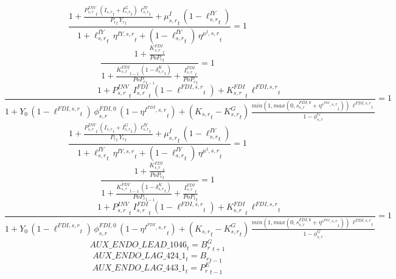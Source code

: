 \noindent[name= `Investment-to-GDP wedge 4 1']
\begin{dmath}
\frac{1+\frac{{{P^{INV}_{s,r}}}_{t}\, \left({{I_{s,r}}}_{t}+{{I^G_{s,r}}}_{t}\right)\, {{\ell^{IY}_{s,r}}}_{t}}{{{P_{r}}}_{t}\, {{Y_r}}_{t}}+{{\mu^{I}_{s,r}}}_{t}\, \left(1-{{\ell^{IY}_{s,r}}}_{t}\right)}{1+{{\ell^{IY}_{s,r}}}_{t}\, {{\eta^{IY,s,r}}}_{t}+\left(1-{{\ell^{IY}_{s,r}}}_{t}\right)\, {{\eta^{\mu^{I},s,r}}}_{t}}=1
\end{dmath}
\noindent[name= `K\_FDI LOM 4 1']
\begin{dmath}
\frac{1+\frac{{{K^{FDI}_{s,r}}}_{t}}{{{PoP_r}}_{t}}}{1+\frac{{{K^{FDI}_{s,r}}}_{t-1}\, \left(1-{{\delta^{K}_{s,r}}}_{t}\right)}{{{PoP_r}}_{t-1}}+\frac{{{I^{FDI}_{s,r}}}_{t}}{{{PoP_r}}_{t}}}=1
\end{dmath}
\noindent[name= `I-FDI target 4 1']
\begin{dmath}
\frac{1+{{P^{INV}_{s,r}}}_{t}\, {{I^{FDI}_{s,r}}}_{t}\, \left(1-{{\ell^{FDI,s,r}}}_{t}\right)+{{K^{FDI}_{s,r}}}_{t}\, {{\ell^{FDI,s,r}}}_{t}}{1+{{Y_0}}\, \left(1-{{\ell^{FDI,s,r}}}_{t}\right)\, {{\phi^{FDI,0}_{s,r}}}\, \left(1-{{\eta^{I^{FDI},s,r}}}_{t}\right)+\left({{K_{s,r}}}_{t}-{{K^G_{s,r}}}_{t}\right)\, \frac{min(1,max(0,{{s^{FDI,0}_{s,r}}}+{{\eta^{s^{FDI},s,r}}}_{t}))\, {{\ell^{FDI,s,r}}}_{t}}{1-{{\phi^{G}_{s,r}}}}}=1
\end{dmath}
\noindent[name= `Investment-to-GDP wedge 5 1']
\begin{dmath}
\frac{1+\frac{{{P^{INV}_{s,r}}}_{t}\, \left({{I_{s,r}}}_{t}+{{I^G_{s,r}}}_{t}\right)\, {{\ell^{IY}_{s,r}}}_{t}}{{{P_{r}}}_{t}\, {{Y_r}}_{t}}+{{\mu^{I}_{s,r}}}_{t}\, \left(1-{{\ell^{IY}_{s,r}}}_{t}\right)}{1+{{\ell^{IY}_{s,r}}}_{t}\, {{\eta^{IY,s,r}}}_{t}+\left(1-{{\ell^{IY}_{s,r}}}_{t}\right)\, {{\eta^{\mu^{I},s,r}}}_{t}}=1
\end{dmath}
\noindent[name= `K\_FDI LOM 5 1']
\begin{dmath}
\frac{1+\frac{{{K^{FDI}_{s,r}}}_{t}}{{{PoP_r}}_{t}}}{1+\frac{{{K^{FDI}_{s,r}}}_{t-1}\, \left(1-{{\delta^{K}_{s,r}}}_{t}\right)}{{{PoP_r}}_{t-1}}+\frac{{{I^{FDI}_{s,r}}}_{t}}{{{PoP_r}}_{t}}}=1
\end{dmath}
\noindent[name= `I-FDI target 5 1']
\begin{dmath}
\frac{1+{{P^{INV}_{s,r}}}_{t}\, {{I^{FDI}_{s,r}}}_{t}\, \left(1-{{\ell^{FDI,s,r}}}_{t}\right)+{{K^{FDI}_{s,r}}}_{t}\, {{\ell^{FDI,s,r}}}_{t}}{1+{{Y_0}}\, \left(1-{{\ell^{FDI,s,r}}}_{t}\right)\, {{\phi^{FDI,0}_{s,r}}}\, \left(1-{{\eta^{I^{FDI},s,r}}}_{t}\right)+\left({{K_{s,r}}}_{t}-{{K^G_{s,r}}}_{t}\right)\, \frac{min(1,max(0,{{s^{FDI,0}_{s,r}}}+{{\eta^{s^{FDI},s,r}}}_{t}))\, {{\ell^{FDI,s,r}}}_{t}}{1-{{\phi^{G}_{s,r}}}}}=1
\end{dmath}
\begin{dmath}
{AUX\_ENDO\_LEAD\_1046}_{t}={{B^G_{r}}}_{t+1}
\end{dmath}
\begin{dmath}
{AUX\_ENDO\_LAG\_424\_1}_{t}={{B_r}}_{t-1}
\end{dmath}
\begin{dmath}
{AUX\_ENDO\_LAG\_443\_1}_{t}={{P^E_r}}_{t-1}
\end{dmath}
